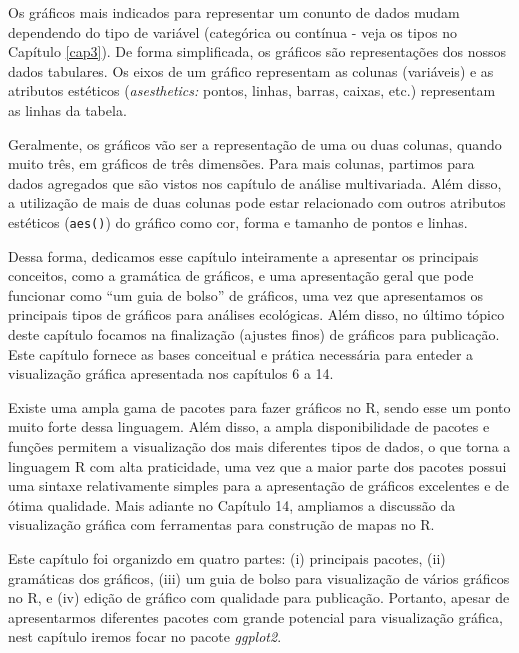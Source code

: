 \documentclass[
]{book}
\begin{document}
Os gráficos mais indicados para representar um conunto de dados mudam dependendo do tipo de variável (categórica ou contínua - veja os tipos no Capítulo \ref{cap3}). De forma simplificada, os gráficos são representações dos nossos dados tabulares. Os eixos de um gráfico representam as colunas (variáveis) e as atributos estéticos (\emph{asesthetics:} pontos, linhas, barras, caixas, etc.) representam as linhas da tabela.

Geralmente, os gráficos vão ser a representação de uma ou duas colunas, quando muito três, em gráficos de três dimensões. Para mais colunas, partimos para dados agregados que são vistos nos capítulo de análise multivariada. Além disso, a utilização de mais de duas colunas pode estar relacionado com outros atributos estéticos (\texttt{aes()}) do gráfico como cor, forma e tamanho de pontos e linhas.

Dessa forma, dedicamos esse capítulo inteiramente a apresentar os principais conceitos, como a gramática de gráficos, e uma apresentação geral que pode funcionar como ``um guia de bolso'' de gráficos, uma vez que apresentamos os principais tipos de gráficos para análises ecológicas. Além disso, no último tópico deste capítulo focamos na finalização (ajustes finos) de gráficos para publicação. Este capítulo fornece as bases conceitual e prática necessária para enteder a visualização gráfica apresentada nos capítulos 6 a 14.

Existe uma ampla gama de pacotes para fazer gráficos no R, sendo esse um ponto muito forte dessa linguagem. Além disso, a ampla disponibilidade de pacotes e funções permitem a visualização dos mais diferentes tipos de dados, o que torna a linguagem R com alta praticidade, uma vez que a maior parte dos pacotes possui uma sintaxe relativamente simples para a apresentação de gráficos excelentes e de ótima qualidade. Mais adiante no Capítulo 14, ampliamos a discussão da visualização gráfica com ferramentas para construção de mapas no R.

Este capítulo foi organizdo em quatro partes: (i) principais pacotes, (ii) gramáticas dos gráficos, (iii) um guia de bolso para visualização de vários gráficos no R, e (iv) edição de gráfico com qualidade para publicação. Portanto, apesar de apresentarmos diferentes pacotes com grande potencial para visualização gráfica, nest capítulo iremos focar no pacote \emph{ggplot2}.
\end{document}
